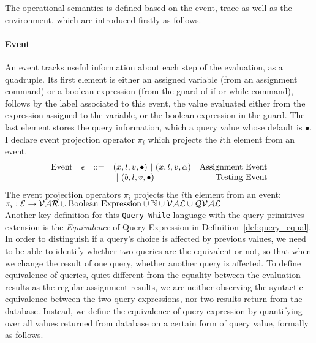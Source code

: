The operational semantics is defined based on the event, trace as well as the 
environment, which are introduced firstly as follows.
\paragraph{Event}
An event tracks useful information about each step of the evaluation, as a quadruple. Its first element is either 
an assigned variable (from an assignment command) or a boolean expression (from the guard of if or while command), follows by 
 the label associated to this event, the value evaluated either from the expression assigned to the variable,
or the boolean expression in the guard.
 The last element stores the query information, which a query value whose default is $\bullet$. I declare event projection operator $\pi_i$ which projects the $i$th element from an event.
%
\[
\begin{array}{llllr}
\mbox{Event} 
& \mathtt{\epsilon} & ::= & 
    ({x}, l, v, \bullet) ~|~ ({x}, l, v, \alpha)  & \mbox{Assignment Event} \\
& & & 
~|~(b, l, v, \bullet)   
&
\mbox{Testing Event}
\end{array}
\]
%
The event projection operators $\pi_i$ projects the $i$th element from an event: 
\\
$\pi_i : 
\mathcal{E} \to \mathcal{VAR}\cup \mbox{Boolean Expression}  \cup \mathbb{N} \cup \mathcal{VAL} \cup \mathcal{QVAL} $ 
\\
%
Another key definition for this {\tt Query While} language with the query primitives extension is the 
\emph{Equivalence} of Query Expression in Definition~\ref{def:query_equal}.
In order to distinguish if a query's choice is affected by previous values, 
we need to be able to identify whether two queries are the equivalent or not, so that when we change the result of one query, 
whether another query is affected. 
To define equivalence of queries,
quiet different from the equality between the evaluation results as the regular assignment results, 
we are neither observing the syntactic equivalence between the two query expressions,
nor two results return from the database. 
Instead, we define the equivalence of query expression by quantifying over all values returned from database on a certain form of query value, formally as follows.

